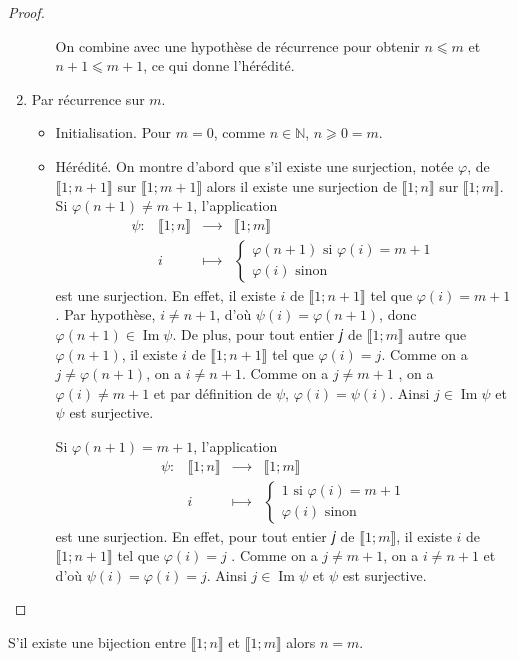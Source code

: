 \begin{proof}
\begin{enumerate}
\begin{itemize}
On combine avec une hypothèse de récurrence pour obtenir \(𝑛⩽𝑚\) et \(𝑛+1⩽𝑚+1\), ce qui donne l'hérédité.
\end{itemize}
\item Par récurrence sur \(𝑚\).
\begin{itemize}
\item
Initialisation. Pour \(𝑚=0\), comme \(𝑛∈ℕ\), \(𝑛⩾0=𝑚\).
\item
Hérédité. On montre d'abord que s'il existe une surjection, notée \(𝜑\), de \(⟦1;𝑛+1⟧\) sur \(⟦1;𝑚+1⟧\) alors il
existe une surjection de \(⟦1;𝑛⟧\) sur \(⟦1;𝑚⟧\).
\\
Si \(𝜑(𝑛+1)≠𝑚+1\), l'application
\begin{equation*}
\begin{matrix}
𝜓:&⟦1;𝑛⟧&⟶&⟦1;𝑚⟧
\\
&𝑖&⟼&\begin{cases}
𝜑(𝑛+1)\text{ si }𝜑(𝑖)=𝑚+1
\\
𝜑(𝑖)\text{ sinon}
\end{cases}
\end{matrix}
\end{equation*}
est une surjection. En effet, il existe \(𝑖\) de \(⟦1;𝑛+1⟧\) tel que \(𝜑(𝑖)=𝑚+1\). Par hypothèse, \(𝑖≠𝑛+1\), d'où
 \(𝜓(i)=𝜑(𝑛+1)\), donc \(𝜑(𝑛+1)∈\operatorname{Im}𝜓\). De plus, pour tout entier 𝑗 de \(⟦1;𝑚⟧\) autre que \(𝜑(𝑛+1)\), il
existe \(𝑖\) de \(⟦1;𝑛+1⟧\) tel que \(𝜑(𝑖)=𝑗\). Comme on a \(𝑗≠𝜑(𝑛+1)\), on a \(𝑖≠𝑛+1\). Comme on a \(𝑗≠𝑚+1\)
, on a \(𝜑(𝑖)≠𝑚+1\) et par définition de \(𝜓\), \(𝜑(𝑖)=𝜓(i)\). Ainsi \(𝑗∈\operatorname{Im}𝜓\) et \(𝜓\) est surjective.
\par\noindent
Si \(𝜑(𝑛+1)=𝑚+1\), l'application
\begin{equation*}
\begin{matrix}
𝜓:&⟦1;𝑛⟧&⟶&⟦1;𝑚⟧
\\
&𝑖&⟼&\begin{cases}
1\text{ si }𝜑(i)=𝑚+1
\\
𝜑(i)\text{ sinon}
\end{cases}
\end{matrix}
\end{equation*}
est une surjection. En effet, pour tout entier 𝑗 de \(⟦1;𝑚⟧\), il existe \(𝑖\) de \(⟦1;𝑛+1⟧\) tel que \(𝜑(𝑖)=𝑗\)
. Comme on a \(𝑗≠𝑚+1\), on a \(𝑖≠𝑛+1\) et d'où \(𝜓(i)=𝜑(𝑖)=𝑗\). Ainsi \(𝑗∈\operatorname{Im}𝜓\) et \(𝜓\) est
surjective.\qedhere
\end{itemize}
\end{enumerate}
\end{proof}
%
\begin{theorem}
S'il existe une bijection entre \(⟦1;𝑛⟧\) et \(⟦1;𝑚⟧\) alors \(𝑛=𝑚\).
\end{theorem}
